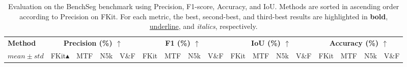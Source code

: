 \documentclass[preprint,12pt]{elsarticle}
\begin{document}
\begin{table}[!htbp]
\centering
\tiny
\setlength{\tabcolsep}{1.3pt} %
\caption{Evaluation on the BenchSeg benchmark using Precision, F1-score, Accuracy, and IoU.
Methods are sorted in ascending order according to Precision on FKit. 
For each metric, the best, second-best, and third-best results are highlighted in \textbf{bold}, \uline{underline}, and \textit{italics}, respectively.}
\label{tab:results_precision_f1_IoU}
\begin{tabular}{lcccccccccccccccc}
\toprule
\textbf{Method} & 
\multicolumn{4}{c}{\textbf{Precision (\%) $\uparrow$}} & 
\multicolumn{4}{c}{\textbf{F1 (\%) $\uparrow$}} & 
\multicolumn{4}{c}{\textbf{IoU (\%) $\uparrow$}} & 
\multicolumn{4}{c}{\textbf{Accuracy (\%) $\uparrow$}} \\
\cmidrule(lr){2-5} \cmidrule(lr){6-9} \cmidrule(lr){10-13} \cmidrule(lr){14-17}
 $mean±std$ & FKit$\blacktriangle$ & MTF & N5k & V\&F & FKit & MTF & N5k & V\&F & FKit & MTF & N5k & V\&F & FKit & MTF & N5k & V\&F \\
\midrule


\end{tabular}
\end{table}
\end{document}
